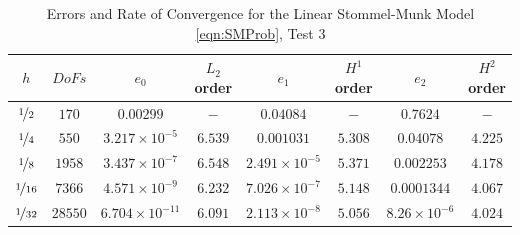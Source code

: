 \begin{table}[H]
\begin{center}
\begin{tabular}{|c|c|c|c|c|c|c|c|}%
  \hline
  $h$ & $DoFs$ & $e_0$ & $L_2$ order & $e_1$ & $H^1$ order & $e_2$ & $H^2$ order \\[0.2em] %
  \hline
  $\nicefrac{1}{2}$ & $170$ & $0.00299$ & $-$ & $0.04084$ & $-$ & $0.7624$ & $-$ \\[0.2em] %
  $\nicefrac{1}{4}$ & $550$ & $3.217\times 10^{-5}$ & $6.539$ & $0.001031$ & $5.308$ & $0.04078$ & $4.225$ \\[0.2em] %
  $\nicefrac{1}{8}$ & $1958$ & $3.437\times 10^{-7}$ & $6.548$ & $2.491\times 10^{-5}$ & $5.371$ & $0.002253$ & $4.178$ \\[0.2em] %
  $\nicefrac{1}{16}$ & $7366$ & $4.571\times 10^{-9}$ & $6.232$ & $7.026\times 10^{-7}$ & $5.148$ & $0.0001344$ & $4.067$ \\[0.2em] %
  $\nicefrac{1}{32}$ & $28550$ & $6.704\times 10^{-11}$ & $6.091$ & $2.113\times 10^{-8}$ & $5.056$ & $8.26\times 10^{-6}$ & $4.024$ \\[0.2em] %
 \hline
\end{tabular}
\end{center}
\caption{Errors and Rate of Convergence for the Linear Stommel-Munk Model \eqref{eqn:SMProb}, Test 3 \cite{Cascon}}
\label{tab:SMsinErrors}
\end{table}

